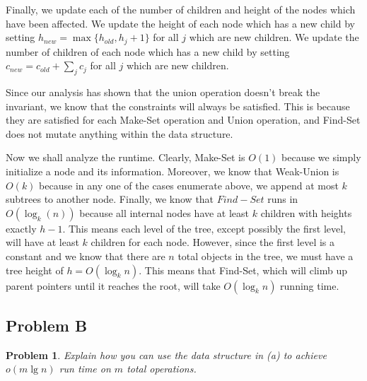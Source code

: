 \documentclass[psamsfonts]{amsart}
\newtheorem{prob}{Problem}[section]
\newenvironment{sol}{{\bfseries Solution}}{\qedsymbol}
\theoremstyle{definition}
\theoremstyle{remark}
\numberwithin{equation}{section}
\begin{document}
\begin{sol}
Finally, we update each of the number of children and height of the nodes which have been affected. We update the height of each node which has a new child by setting $h_{new} = \max\{h_{old}, h_{j} + 1\}$ for all $j$ which are new children. We update the number of children of each node which has a new child by setting $c_{new} = c_{old} + \sum_j c_j$ for all $j$ which are new children. 

Since our analysis has shown that the union operation doesn't break the invariant, we know that the constraints will always be satisfied. This is because they are satisfied for each Make-Set operation and Union operation, and Find-Set does not mutate anything within the data structure.

Now we shall analyze the runtime. Clearly, Make-Set is $O(1)$ because we simply initialize a node and its information. Moreover, we know that Weak-Union is $O(k)$ because in any one of the cases enumerate above, we append at most $k$ subtrees to another node. Finally, we know that $Find-Set$ runs in $O(\log_{k} (n))$ because all internal nodes have at least $k$ children with heights exactly $h-1$. This means each level of the tree, except possibly the first level, will have at least $k$ children for each node. However, since the first level is a constant and we know that there are $n$ total objects in the tree, we must have a tree height of $h = O(\log_k n)$. This means that Find-Set, which will climb up parent pointers until it reaches the root, will take $O(\log_k n)$ running time. 
\end{sol}

\subsection{Problem B}

\begin{prob}
Explain how you can use the data structure in (a) to achieve $o(m \lg n)$ run time on $m$ total operations.
\end{prob}
\end{document}
